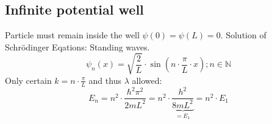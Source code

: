 \subsection{Infinite potential well}
Particle must remain inside the well \(\psi(0) = \psi(L) = 0\). Solution of Schrödinger Eqations: Standing waves.
\begin{equation*}
    \psi_n (x)  = \sqrt{\frac{2}{L}}\cdot\sin(n\cdot\frac{\pi}{L}\cdot x); n \in \mathbb{N}
\end{equation*}
Only certain \(k = n\cdot\frac{\pi}{L}\) and thus \(\lambda\) allowed:
\begin{equation*}
    E_n = n^2 \cdot \frac{\hbar^2 \pi^2}{2 m L^2} 
        = n^2 \cdot \underbrace{\frac{h^2}{8 m L^2}}_{= E_1} 
        = n^2 \cdot E_1
\end{equation*}

